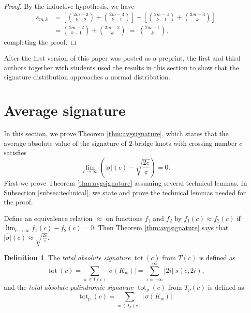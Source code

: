 \documentclass[12pt]{amsart}
\theoremstyle{definition}
\newtheorem{definition}[theorem]{Definition}
\theoremstyle{remark}
\numberwithin{equation}{section}
\def\tot{\operatorname{tot}}
\begin{document}
\begin{proof}
By the inductive hypothesis, we have
\begin{align*}
s_{m,k} & = \left[\binom{2m-3}{k-2} + \binom{2m-3}{k-1}\right]+\left[\binom{2m-3}{k-1} + \binom{2m-3}{k}\right]\\
& = \binom{2m-2}{k-1} + \binom{2m-2}{k} \; = \; \binom{2m-1}{k},
\end{align*}
completing the proof.
\end{proof}


After the first version of this paper was posted as a preprint, the first and third authors together with students \cite{BCDFMST} used the results in this section to show that the signature distribution approaches a normal distribution.



\section{Average signature}
\label{sec:average}

In this section, we prove Theorem \ref{thm:avgsignature}, which states that the average absolute value of the signature of $2$-bridge knots with crossing number $c$ satisfies
\[\lim_{c\to\infty}\left(\overline{|\sigma|}(c)-\sqrt{\frac{2c}{\pi}}\right)=0.\]
 First we prove Theorem \ref{thm:avgsignature} assuming several technical lemmas. In Subsection \ref{subsec:technical}, we state and prove the technical lemmas needed for the proof.

Define an equivalence relation $\approx$ on functions $f_1$ and $f_2$ by $f_1(c)\approx f_2(c)$ if $\lim_{c\to\infty}f_1(c)-f_2(c)=0$. Then Theorem \ref{thm:avgsignature} says that $\overline{|\sigma|}(c)\approx \sqrt{\frac{2c}{\pi}}$. 

\begin{definition}
\label{def:tot}
    The \textit{total absolute signature} $\tot(c)$ from $T(c)$ is defined as 
    \[\tot(c) = \sum_{w\in T(c)} |\sigma(K_w)| =  \sum_{i=-\infty}^\infty |2i| \; s(c,2i),\]
    and the \textit{total absolute palindromic signature} $\tot_p(c)$ from $T_p(c)$ is defined as 
    \[\tot_p(c) = \sum_{w\in T_p(c)} |\sigma(K_w)|.\]
\end{definition}
\end{document}

